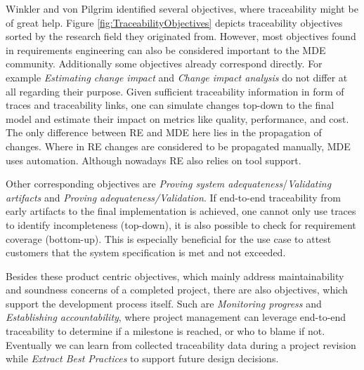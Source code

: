 \documentclass[runningheads,a4paper]{llncs}
\begin{document}
Winkler and von Pilgrim \cite{TraceabilitySurvey} identified several objectives, where traceability might be of great help. 
Figure \ref{fig:TraceabilityObjectives} depicts traceability objectives sorted by the research field they originated from. 
However, most objectives found in requirements engineering can also be considered important to the MDE community. 
Additionally some objectives already correspond directly.
For example \textit{Estimating change impact} and \textit{Change impact analysis} do not differ at all regarding their purpose. 
Given sufficient traceability information in form of traces and traceability links, one can simulate changes top-down to the final model and estimate their impact on metrics like quality, performance, and cost. 
The only difference between RE and MDE here lies in the propagation of changes. 
Where in RE changes are considered to be propagated manually, MDE uses automation. 
Although nowadays RE also relies on tool support.

Other corresponding objectives are \textit{Proving system adequateness}/\textit{Validating artifacts} and \textit{Proving adequateness/Validation}. 
If end-to-end traceability from early artifacts to the final implementation is achieved, one cannot only use traces to identify incompleteness (top-down), it is also possible to check for requirement coverage (bottom-up).
This is especially beneficial for the use case to attest customers that the system specification is met and not exceeded.

Besides these product centric objectives, which mainly address maintainability and soundness concerns of a completed project, there are also objectives, which support the development process itself.
Such are \textit{Monitoring progress} and \textit{Establishing accountability}, where project management can leverage end-to-end traceability to determine if a milestone is reached, or who to blame if not. 
Eventually we can learn from collected traceability data during a project revision while \textit{Extract Best Practices} to support future design decisions. 
\end{document}
